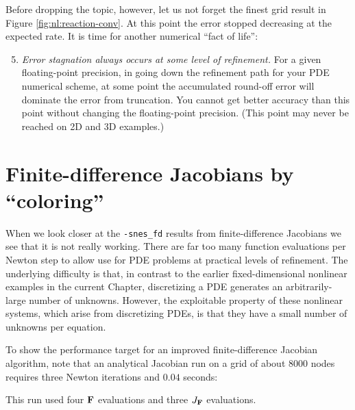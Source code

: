 Before dropping the topic, however, let us not forget the finest grid result in Figure  \ref{fig:nl:reaction-conv}.  At this point the error stopped decreasing at the expected rate.  It is time for another numerical ``fact of life'':
\renewcommand{\labelenumi}{Fact \Roman{enumi}.}
\begin{enumerate}
\setcounter{enumi}{4}
\item \emph{Error stagnation always occurs at \emph{some} level of refinement.}  For a given floating-point precision, in going down the refinement path for your PDE numerical scheme, at some point the accumulated round-off error will dominate the error from truncation.  You cannot get better accuracy than this point without changing the floating-point precision.  (This point may never be reached on 2D and 3D examples.)
\end{enumerate}



\section{Finite-difference Jacobians by ``coloring''} \label{sec:nl:coloring}

When we look closer at the \texttt{-snes\_fd} results from finite-difference Jacobians we see that it is not really working.  There are far too many function evaluations per Newton step to allow use for PDE problems at practical levels of refinement.  The underlying difficulty is that, in contrast to the earlier fixed-dimensional nonlinear examples in the current Chapter, discretizing a PDE generates an arbitrarily-large number of unknowns.  However, the exploitable property of these nonlinear systems, which arise from discretizing PDEs, is that they have a small number of unknowns per equation.

To show the performance target for an improved finite-difference Jacobian algorithm, note that an analytical Jacobian run on a grid of about 8000 nodes requires three Newton iterations and $0.04$ seconds:
\label{etc:nl:bestreaction}
This run used four $\mathbf{F}$ evaluations and three $J_{\mathbf{F}}$ evaluations.

